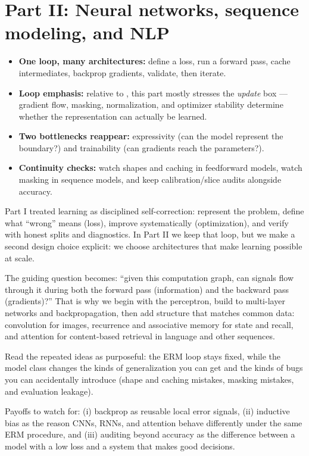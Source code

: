 \part*{Part II: Neural networks, sequence modeling, and NLP}
\begin{tcolorbox}[summarybox, title={How to read Part II (rolling window)}]
\begin{itemize}
  \item \textbf{One loop, many architectures:} define a loss, run a forward pass, cache intermediates, backprop gradients, validate, then iterate.
  \item \textbf{Loop emphasis:} relative to , this part mostly stresses the \emph{update} box --- gradient flow, masking, normalization, and optimizer stability determine whether the representation can actually be learned.
  \item \textbf{Two bottlenecks reappear:} expressivity (can the model represent the boundary?) and trainability (can gradients reach the parameters?).
  \item \textbf{Continuity checks:} watch shapes and caching in feedforward models, watch masking in sequence models, and keep calibration/slice audits alongside accuracy.
\end{itemize}
\end{tcolorbox}
\begin{tcolorbox}[summarybox, title={Part II bridge: from ERM to trainable architectures}]
Part I treated learning as disciplined self-correction: represent the problem, define what ``wrong'' means
(loss), improve systematically (optimization), and verify with honest splits and diagnostics. In Part II we
keep that loop, but we make a second design choice explicit: we choose architectures that make learning
possible at scale.

The guiding question becomes: ``given this computation graph, can signals flow through it during both the
forward pass (information) and the backward pass (gradients)?'' That is why we begin with the perceptron,
build to multi-layer networks and backpropagation, then add structure that matches common data: convolution
for images, recurrence and associative memory for state and recall, and attention for content-based retrieval
in language and other sequences.

Read the repeated ideas as purposeful: the ERM loop stays fixed, while the model class changes the kinds of
generalization you can get and the kinds of bugs you can accidentally introduce (shape and caching mistakes,
masking mistakes, and evaluation leakage).

Payoffs to watch for: (i) backprop as reusable local error signals, (ii) inductive bias as the reason CNNs,
RNNs, and attention behave differently under the same ERM procedure, and (iii) auditing beyond accuracy as
the difference between a model with a low loss and a system that makes good decisions.
\end{tcolorbox}
